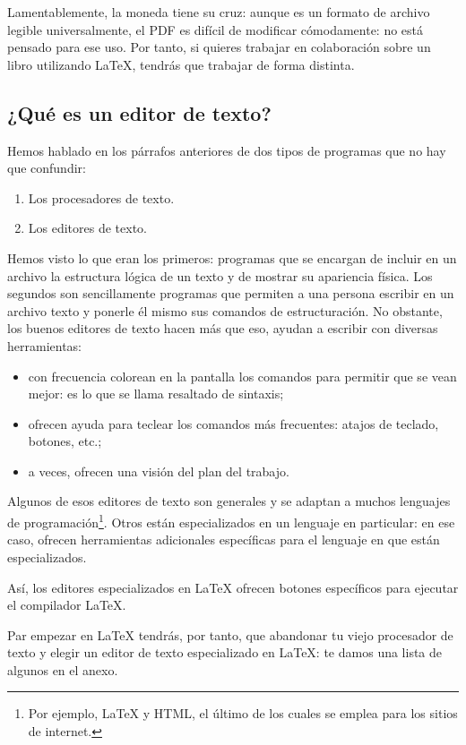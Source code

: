Lamentablemente, la moneda tiene su cruz: aunque es un formato de archivo legible universalmente, el PDF es difícil de modificar cómodamente: no está pensado para ese uso. Por tanto, si quieres trabajar en colaboración sobre un libro utilizando \LaTeX, tendrás que trabajar de forma distinta.

\subsection{¿Qué es un editor de texto?}

Hemos hablado en los párrafos anteriores de dos tipos de programas que no hay que confundir:
\begin{enumerate}
	\item Los procesadores de texto.
	\item Los editores de texto.
\end{enumerate}

Hemos visto lo que eran los primeros: programas que se encargan de incluir en un archivo la estructura lógica de un texto y de mostrar su apariencia física. Los segundos son sencillamente programas que permiten a una persona escribir en un archivo texto y ponerle él mismo sus comandos de estructuración. No obstante, los buenos editores de texto hacen más que eso, ayudan a escribir con diversas herramientas:
\begin{itemize}
\item con frecuencia colorean en la pantalla los comandos para permitir que se vean mejor: es lo que se llama resaltado de sintaxis;\label{colorationsyntax}
\item ofrecen ayuda para teclear los comandos más frecuentes:  atajos de teclado, botones, etc.;
\item a veces, ofrecen una visión del plan del trabajo.
\end{itemize}

Algunos de esos editores de texto son generales y se adaptan a muchos lenguajes de programación\footnote{Por ejemplo,  \LaTeX{} y HTML, el último de los cuales se emplea para los sitios de internet.}. Otros están especializados en un lenguaje en particular: en ese caso, ofrecen herramientas adicionales específicas para el lenguaje en que están especializados. 

Así, los editores especializados en  \LaTeX{} ofrecen botones específicos para ejecutar el compilador  \LaTeX{}.

Par empezar en \LaTeX{} tendrás, por tanto, que abandonar tu viejo procesador de texto y elegir un editor de texto especializado en \LaTeX{}: te damos una lista de algunos en el anexo.


